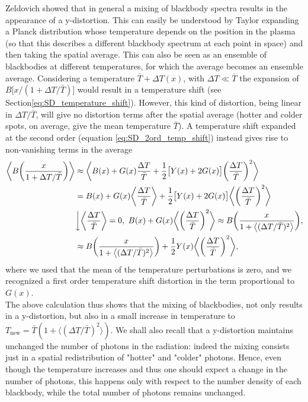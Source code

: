 Zeldovich \cite{Zeldovich1972} showed that in general a mixing of blackbody spectra results in the appearance of a y-distortion. This can easily be understood by Taylor expanding a Planck distribution whose temperature depends on the position in the plasma (so that this describes a different blackbody spectrum at each point in space) and then taking the spatial average. This can also be seen as an ensemble of blackbodies at different temperatures, for which the average becomes an ensemble average. Considering a temperature $\bar{T}+\Delta T(x)$, with $\Delta T\ll\bar{T}$ the expansion of $B\big[x/(1+\Delta T/\bar T)\big]$ would result in a temperature shift (see Section\ref{eq:SD_temperature_shift}). However, this kind of distortion, being linear in $\Delta T/\bar T$, will give no distortion terms after the spatial average (hotter and colder spots, on average, give the mean temperature $\bar T$). A temperature shift expanded at the second order (equation \eqref{eq:SD_2ord_temp_shift}) instead gives rise to non-vanishing terms in the average
\begin{align}
     \nonumber\bigg\langle B\bigg(\frac{x}{1+\Delta T/\bar T}\bigg)\bigg\rangle&\approx\bigg\langle B(x)+G(x)\frac{\Delta T}{\bar T}+\frac{1}{2}\big[Y(x)+2G(x)\big]\bigg(\frac{\Delta T}{\bar T}\bigg)^2\bigg\rangle\\\nonumber
     &=B(x)+G(x)\bigg\langle\frac{\Delta T}{\bar T}\bigg\rangle+\frac{1}{2}\big[Y(x)+2G(x)\big]\bigg\langle\bigg(\frac{\Delta T}{\bar T}\bigg)^2\bigg\rangle\\&\bigg\downarrow \bigg\langle\frac{\Delta T}{\bar T}\bigg\rangle=0,\ B(x)+G(x)\bigg\langle\bigg(\frac{\Delta T}{\bar T}\bigg)^2\bigg\rangle\approx B\bigg(\frac{x}{1+\big\langle(\Delta T/\bar T)^2\big\rangle}\bigg),\nonumber\\
     &\approx B\bigg(\frac{x}{1+\big\langle(\Delta T/\bar T)^2\big\rangle}\bigg)+\frac{1}{2}Y(x)\bigg\langle\bigg(\frac{\Delta T}{\bar T}\bigg)^2\bigg\rangle,\label{eq:Mixing_Y_SD}
\end{align}
where we used that the mean of the temperature perturbations is zero, and we recognized a first order temperature shift distortion in the term proportional to $G(x)$.\\ The above calculation thus shows that the mixing of blackbodies, not only results in a y-distortion, but also in a small increase in temperature to $T_{\text{new}}=\bar T(1+\langle(\Delta T/\bar T)^2\rangle)$. We shall also recall that a y-distortion maintains unchanged the number of photons in the radiation: indeed the mixing consists just in a spatial redistribution of "hotter" and "colder" photons. Hence, even though the temperature increases and thus one should expect a change in the number of photons, this happens only with respect to the number density of each blackbody, while the total number of photons remains unchanged.


